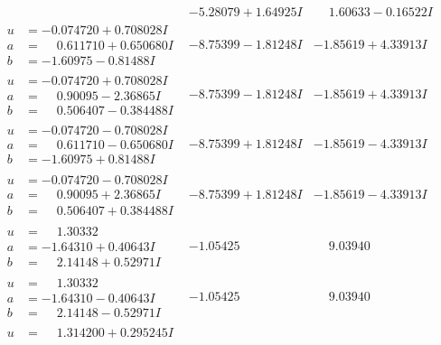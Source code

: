 \documentclass[1p]{elsarticle_modified}
\theoremstyle{definition}
\begin{document}
$$\begin{array}{c|c|c}
 & -5.28079 + 1.64925 I & \phantom{-}1.60633 - 0.16522 I \\ \hline\begin{aligned}
u &= -0.074720 + 0.708028 I \\
a &= \phantom{-}0.611710 + 0.650680 I \\
b &= -1.60975 - 0.81488 I\end{aligned}
 & -8.75399 - 1.81248 I & -1.85619 + 4.33913 I \\ \hline\begin{aligned}
u &= -0.074720 + 0.708028 I \\
a &= \phantom{-}0.90095 - 2.36865 I \\
b &= \phantom{-}0.506407 - 0.384488 I\end{aligned}
 & -8.75399 - 1.81248 I & -1.85619 + 4.33913 I \\ \hline\begin{aligned}
u &= -0.074720 - 0.708028 I \\
a &= \phantom{-}0.611710 - 0.650680 I \\
b &= -1.60975 + 0.81488 I\end{aligned}
 & -8.75399 + 1.81248 I & -1.85619 - 4.33913 I \\ \hline\begin{aligned}
u &= -0.074720 - 0.708028 I \\
a &= \phantom{-}0.90095 + 2.36865 I \\
b &= \phantom{-}0.506407 + 0.384488 I\end{aligned}
 & -8.75399 + 1.81248 I & -1.85619 - 4.33913 I \\ \hline\begin{aligned}
u &= \phantom{-}1.30332\phantom{ +0.000000I} \\
a &= -1.64310 + 0.40643 I \\
b &= \phantom{-}2.14148 + 0.52971 I\end{aligned}
 & -1.05425\phantom{ +0.000000I} & \phantom{-}9.03940\phantom{ +0.000000I} \\ \hline\begin{aligned}
u &= \phantom{-}1.30332\phantom{ +0.000000I} \\
a &= -1.64310 - 0.40643 I \\
b &= \phantom{-}2.14148 - 0.52971 I\end{aligned}
 & -1.05425\phantom{ +0.000000I} & \phantom{-}9.03940\phantom{ +0.000000I} \\ \hline\begin{aligned}
u &= \phantom{-}1.314200 + 0.295245 I \\

\end{aligned}
\end{array}$$
\end{document}
